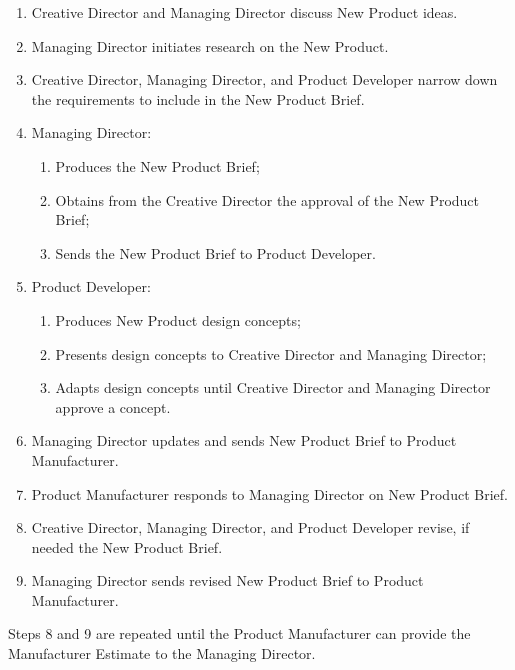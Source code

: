 \documentclass[graybox,envcountchap,sectrefs]{svmono}
\begin{document}
\begin{svgraybox}
\begin{enumerate}
	\item Creative Director and Managing Director discuss New Product ideas.
	\item Managing Director initiates research on the New Product.
	\item Creative Director, Managing Director, and Product Developer narrow down the requirements to include in the New Product Brief.
	\item Managing Director:
		\begin{enumerate}
			\item Produces the New Product Brief;
			\item Obtains from the Creative Director the approval of the New Product Brief;
			\item Sends the New Product Brief to Product Developer.
		\end{enumerate}
	\item Product Developer:
		\begin{enumerate}
			\item Produces New Product design concepts;
			\item Presents design concepts to Creative Director and Managing Director;
			\item Adapts design concepts until Creative Director and Managing Director approve a concept.
		\end{enumerate}
	\item Managing Director updates and sends New Product Brief to Product Manufacturer.
	\item Product Manufacturer responds to Managing Director on New Product Brief.
	\item Creative Director, Managing Director, and Product Developer revise, if needed the New Product Brief.
	\item Managing Director sends revised New Product Brief to Product Manufacturer.
\end{enumerate}

Steps 8 and 9 are repeated until the Product Manufacturer can provide the Manufacturer Estimate to the Managing Director.


\end{svgraybox}
\end{document}
